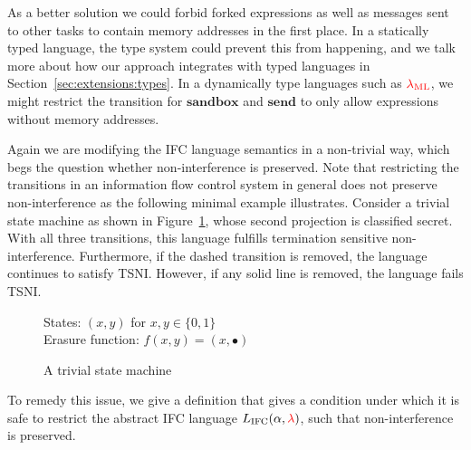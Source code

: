 \documentclass{sigplanconf}
\newcommand{\Red}[1]{{\color{red} #1}}
\begin{document}
As a better solution we could forbid forked expressions as well
as messages sent to other tasks to contain memory addresses in the
first place.  In a statically typed language, the type system could
prevent this from happening, and we talk more about how our
approach integrates with typed languages in
Section~\ref{sec:extensions:types}.
In a dynamically type languages such as \ensuremath{\Red{\lambda_{\text{ML}}}}, we might
restrict the transition for \ensuremath{\mathbf{sandbox}} and \ensuremath{\mathbf{send}} to only allow expressions
without memory addresses.

Again we are modifying the IFC language semantics in a non-trivial way,
which begs the question whether non-interference is preserved.
Note that restricting the transitions in an information flow control
system in general does not preserve non-interference as the following
minimal example illustrates.
Consider a trivial state machine as shown
in Figure~\ref{fig:trivial-sm}, whose second projection is classified
secret.  With all three transitions, this language fulfills
termination sensitive non-interference.  Furthermore, if the
dashed transition
is removed, the language continues to satisfy TSNI.  However, if any
solid line is removed, the language fails TSNI.

\begin{figure}
  States: $(x,y)$ for $x,y \in \{0,1\}$ \\
  Erasure function: $f(x,y) = (x,\bullet)$
  
  \begin{center}\end{center}
  
  \label{fig:trivial-sm}
  \caption{A trivial state machine}
\end{figure}

To remedy this issue, we give a definition that gives a condition
under which it is safe to restrict the abstract IFC language
\ensuremath{L_\text{IFC}(\alpha,\Red{\lambda})}, such that non-interference is preserved.
\end{document}
